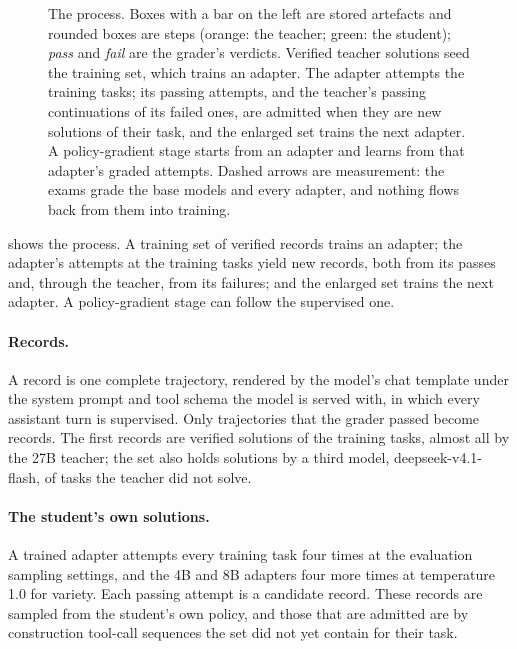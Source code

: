 \begin{figure}[t]
\caption{The process. Boxes with a bar on the left are stored artefacts and rounded boxes are steps (orange: the
  teacher; green: the student); \emph{pass} and \emph{fail} are the grader's verdicts. Verified teacher solutions seed
  the training set, which trains an adapter. The adapter attempts the training tasks; its passing attempts, and the
  teacher's passing continuations of its failed ones, are admitted when they are new solutions of their task, and the
  enlarged set trains the next adapter. A policy-gradient stage starts from an adapter and learns from that adapter's
  graded attempts. Dashed arrows are measurement: the exams grade the base models and every adapter, and nothing flows
  back from them into training.}\label{fig:pipeline}
\end{figure}

 shows the process. A training set of verified records trains an adapter; the adapter's attempts
at the training tasks yield new records, both from its passes and, through the teacher, from its failures; and the
enlarged set trains the next adapter. A policy-gradient stage can follow the supervised one.

\paragraph{Records.} A record is one complete trajectory, rendered by the model's chat template under the system prompt
and tool schema the model is served with, in which every assistant turn is supervised. Only trajectories that the grader
passed become records. The first records are verified solutions of the training tasks, almost all by the 27B teacher; the set also holds
\dataExternalTrain{} solutions by a third model, deepseek-v4.1-flash, of tasks the teacher did not solve.

\paragraph{The student's own solutions.} A trained adapter attempts every training task four times at the evaluation
sampling settings, and the 4B and 8B adapters four more times at temperature 1.0 for variety. Each passing attempt is a
candidate record. These records are sampled from the student's own policy, and those that are admitted are by
construction tool-call sequences the set did not yet contain for their task.

